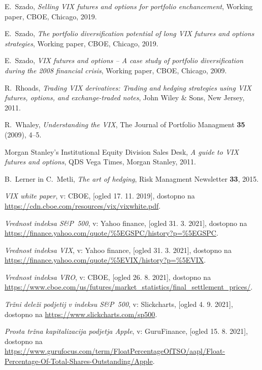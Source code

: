 \documentclass[12pt,a4paper, reqno]{amsart}
\theoremstyle{definition} %
\theoremstyle{plain} %
\begin{document}
\newpage
\begin{thebibliography}{99}

\bibitem{}
E.~Szado, \emph{Selling VIX futures and options for portfolio enchancement}, Working paper, CBOE, Chicago, 2019.

\bibitem{}
E.~Szado, \emph{The portfolio diversification potential of long VIX futures and options strategies}, Working paper, CBOE, Chicago, 2019.

\bibitem{}
E.~Szado, \emph{VIX futures and options -- A case study of portfolio diversification during the 2008 financial crisis}, Working paper, CBOE, Chicago, 2009.

R.~Rhoads, \emph{Trading VIX derivatives: Trading and hedging strategies using VIX futures, options, and exchange-traded notes}, John Wiley \& Sons, New Jersey, 2011.

R.~Whaley, \emph{Understanding the VIX}, The Journal of Portfolio Managment \textbf{35} (2009), 4--5.

Morgan Stanley's Institutional Equity Division Sales Desk, \emph{A guide to VIX futures and options}, QDS Vega Times, Morgan Stanley, 2011.

B.~Lerner in C.~Metli, \emph{The art of hedging}, Risk Managment Newsletter \textbf{33}, 2015.

\bibitem{}
\emph{VIX white paper}, v: CBOE, [ogled 17. 11. 2019], dostopno na \url{https://cdn.cboe.com/resources/vix/vixwhite.pdf}.

\bibitem{}
\emph{Vrednost indeksa S\&P~500}, v: Yahoo finance, [ogled 31. 3. 2021], dostopno na \url{https://finance.yahoo.com/quote/%5EGSPC/history?p=%5EGSPC}.

\bibitem{}
\emph{Vrednost indeksa VIX}, v: Yahoo finance, [ogled 31. 3. 2021], dostopno na \url{https://finance.yahoo.com/quote/%5EVIX/history?p=%5EVIX}.

\bibitem{}
\emph{Vrednost indeksa VRO}, v: CBOE, [ogled 26. 8. 2021], dostopno na \url{https://www.cboe.com/us/futures/market_statistics/final_settlement_prices/}.

\emph{Tržni deleži podjetij v indeksu S\&P~500}, v: Slickcharts, [ogled 4. 9. 2021], dostopno na \url{https://www.slickcharts.com/sp500}.

\emph{Prosta tržna kapitalizacija podjetja Apple}, v: GuruFinance, [ogled 15. 8. 2021], dostopno na \url{https://www.gurufocus.com/term/FloatPercentageOfTSO/aapl/Float-Percentage-Of-Total-Shares-Outstanding/Apple}.


\end{thebibliography}
\end{document}
